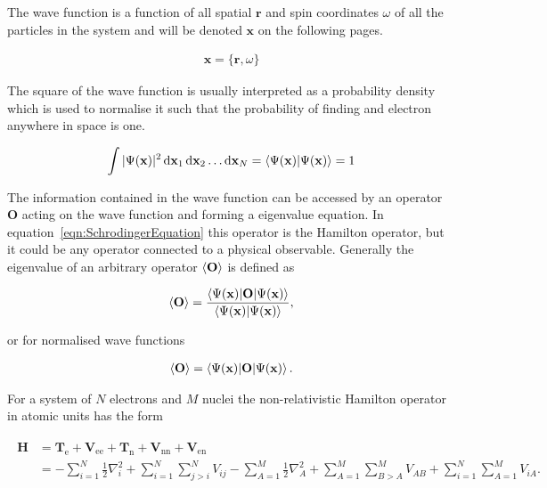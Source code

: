 The wave function is a function of all spatial $\mathbf{r}$ and spin
coordinates $\omega$ of all the particles in the system and will be denoted
$\mathbf{x}$ on the following pages.  

\begin{align}
	\mathbf{x}=\{\mathbf{r},\omega\}
\end{align}

The square of the wave function is usually interpreted as a probability density
which is used to normalise it such that the probability of finding and electron
anywhere in space is one.

\begin{align}
	\int |\Psi(\mathbf{x})|^2\dif \mathbf{x}_1\dif \mathbf{x}_2\ldots\dif \mathbf{x}_N=\braket{\Psi(\mathbf{x})|\Psi(\mathbf{x})}=1
\end{align}

The information contained in the wave function can be accessed by an operator
$\mathbf{O}$ acting on the wave function and forming a eigenvalue equation. In
equation~\eqref{eqn:SchrodingerEquation} this operator is the Hamilton
operator, but it could be any operator connected to a physical observable.
Generally the eigenvalue of an arbitrary operator $\braket{\mathbf{O}}$ is
defined as

\begin{equation}
	\braket{\mathbf{O}}=\frac{\braket{\Psi(\mathbf{x})|\mathbf{O}|\Psi(\mathbf{x})}}{\braket{\Psi(\mathbf{x})|\Psi(\mathbf{x})}},
\end{equation}

or for normalised wave functions

\begin{align}
	\braket{\mathbf{O}}=\braket{\Psi(\mathbf{x})|\mathbf{O}|\Psi(\mathbf{x})}.
\end{align}

For a system of $N$ electrons and $M$ nuclei the non-relativistic Hamilton
operator in atomic units has the form

\begin{align}
\begin{aligned}
    \mathbf{H}&=\mathbf{T}_\text{e} + \mathbf{V}_\text{ee} + \mathbf{T}_\text{n} + \mathbf{V}_\text{nn} + \mathbf{V}_\text{en} \\
    &=-\sum_{i=1}^N\frac{1}{2}\nabla_i^2
    + \sum_{i=1}^N\sum_{j>i}^NV_{ij}
    - \sum_{A=1}^M\frac{1}{2}\nabla_A^2
    + \sum_{A=1}^M\sum_{B>A}^MV_{AB}
    + \sum_{i=1}^N\sum_{A=1}^MV_{iA}.\label{eqn:hamiltonoperator}
\end{aligned}
\end{align}

